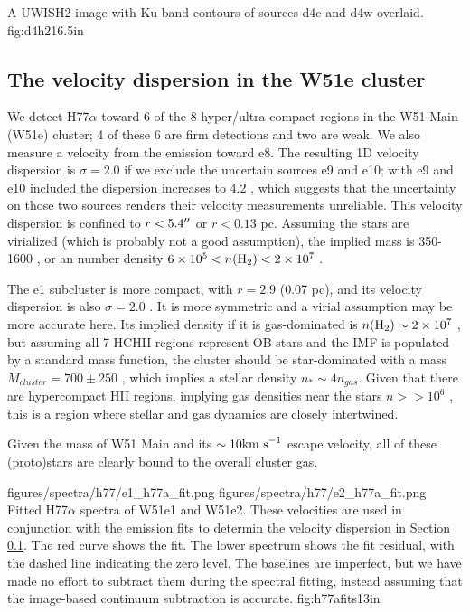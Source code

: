 {A UWISH2 \hh image with Ku-band contours of sources d4e and d4w overlaid.
}
{fig:d4h2}{1}{6.5in}

\subsection{The velocity dispersion in the W51e cluster}
\label{sec:vdisp}
We detect H77$\alpha$ toward 6 of the 8 hyper/ultra compact \hii regions in the
W51 Main (W51e) cluster; 4 of these 6 are firm detections and two are weak.  We
also measure a velocity from the \formaldehyde emission toward e8.  The
resulting 1D velocity dispersion is $\sigma=2.0$ \kms if we exclude the
uncertain sources e9
and e10; with e9 and e10 included the dispersion increases to 4.2 \kms, which
suggests that the uncertainty on those two sources renders their velocity
measurements unreliable.  This velocity dispersion is confined to
$r<5.4\mbox{$^{\prime\prime}$}$ or $r<0.13$ pc.  Assuming the stars are virialized (which is
probably not a good assumption), the implied mass is 350-1600 \msun, or an \hh
number density $6\times10^{5} < n(\textrm{H}_{2}) < 2\times10^{7}$ \percc.

The e1 subcluster is more compact, with $r=2.9$ \arcsec (0.07 pc), and its
velocity dispersion is also $\sigma=2.0$ \kms.  It is more symmetric and a virial
assumption may be more accurate here.  Its implied density if it is gas-dominated
is $n(\textrm{H}_{2})\sim2\times10^{7}$ \percc, but assuming all 7 HCHII regions represent OB
stars and the IMF is populated by a standard \citet{Kroupa2001a} mass function,
the cluster should be star-dominated with a mass $M_{cluster}=700\pm250$ \msun,
which implies a stellar density $n_* \sim 4 n_{gas}$.  Given that there are 
hypercompact HII regions, implying gas densities near the stars $n>>10^6$ \percc,
this is a region where stellar and gas dynamics are closely intertwined.

Given the mass of W51 Main and its $\sim10\textrm{km~s}^{-1}$ escape velocity, all of these
(proto)stars are clearly bound to the overall cluster gas. 

\FigureTwo
{figures/spectra/h77/e1_h77a_fit.png}
{figures/spectra/h77/e2_h77a_fit.png}
{Fitted H77$\alpha$ spectra of W51e1 and W51e2.  These velocities are used in
conjunction with the \formaldehyde emission fits to determin the velocity
dispersion in Section \ref{sec:vdisp}.
The red curve shows the fit.  The lower spectrum shows the fit residual, with
the dashed line indicating the zero level.  The baselines are imperfect, but we
have made no effort to subtract them during the spectral fitting, instead
assuming that the image-based continuum subtraction is accurate.
}
{fig:h77afits}{1}{3in}

